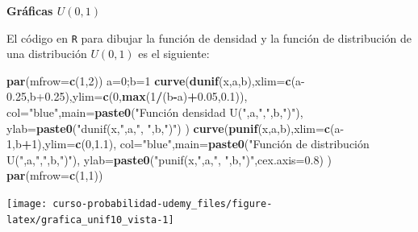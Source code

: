 \documentclass[]{book}
\newenvironment{Shaded}{\begin{snugshade}}{\end{snugshade}}
\newcommand{\DataTypeTok}[1]{\textcolor[rgb]{0.13,0.29,0.53}{#1}}
\newcommand{\DecValTok}[1]{\textcolor[rgb]{0.00,0.00,0.81}{#1}}
\newcommand{\FloatTok}[1]{\textcolor[rgb]{0.00,0.00,0.81}{#1}}
\newcommand{\KeywordTok}[1]{\textcolor[rgb]{0.13,0.29,0.53}{\textbf{#1}}}
\newcommand{\NormalTok}[1]{#1}
\newcommand{\OperatorTok}[1]{\textcolor[rgb]{0.81,0.36,0.00}{\textbf{#1}}}
\newcommand{\StringTok}[1]{\textcolor[rgb]{0.31,0.60,0.02}{#1}}
\begin{document}
\textbf{Gráficas \(U(0,1)\)}

El código en \texttt{R} para dibujar la función de densidad y la función de distribución de una distribución \(U(0,1)\) es el siguiente:

\begin{Shaded}
\begin{Highlighting}[]
\KeywordTok{par}\NormalTok{(}\DataTypeTok{mfrow=}\KeywordTok{c}\NormalTok{(}\DecValTok{1}\NormalTok{,}\DecValTok{2}\NormalTok{))}
\NormalTok{a=}\DecValTok{0}\NormalTok{;b=}\DecValTok{1}
\KeywordTok{curve}\NormalTok{(}\KeywordTok{dunif}\NormalTok{(x,a,b),}\DataTypeTok{xlim=}\KeywordTok{c}\NormalTok{(a}\FloatTok{-0.25}\NormalTok{,b}\FloatTok{+0.25}\NormalTok{),}\DataTypeTok{ylim=}\KeywordTok{c}\NormalTok{(}\DecValTok{0}\NormalTok{,}\KeywordTok{max}\NormalTok{(}\DecValTok{1}\OperatorTok{/}\NormalTok{(b}\OperatorTok{-}\NormalTok{a)}\OperatorTok{+}\FloatTok{0.05}\NormalTok{,}\FloatTok{0.1}\NormalTok{)),}
      \DataTypeTok{col=}\StringTok{"blue"}\NormalTok{,}\DataTypeTok{main=}\KeywordTok{paste0}\NormalTok{(}\StringTok{"Función densidad  U("}\NormalTok{,a,}\StringTok{","}\NormalTok{,b,}\StringTok{")"}\NormalTok{),}
      \DataTypeTok{ylab=}\KeywordTok{paste0}\NormalTok{(}\StringTok{"dunif(x,"}\NormalTok{,a,}\StringTok{", "}\NormalTok{,b,}\StringTok{")"}\NormalTok{)}
\NormalTok{      )}
\KeywordTok{curve}\NormalTok{(}\KeywordTok{punif}\NormalTok{(x,a,b),}\DataTypeTok{xlim=}\KeywordTok{c}\NormalTok{(a}\DecValTok{-1}\NormalTok{,b}\OperatorTok{+}\DecValTok{1}\NormalTok{),}\DataTypeTok{ylim=}\KeywordTok{c}\NormalTok{(}\DecValTok{0}\NormalTok{,}\FloatTok{1.1}\NormalTok{),}
      \DataTypeTok{col=}\StringTok{"blue"}\NormalTok{,}\DataTypeTok{main=}\KeywordTok{paste0}\NormalTok{(}\StringTok{"Función de distribución U("}\NormalTok{,a,}\StringTok{","}\NormalTok{,b,}\StringTok{")"}\NormalTok{),}
      \DataTypeTok{ylab=}\KeywordTok{paste0}\NormalTok{(}\StringTok{"punif(x,"}\NormalTok{,a,}\StringTok{", "}\NormalTok{,b,}\StringTok{")"}\NormalTok{,}\DataTypeTok{cex.axis=}\FloatTok{0.8}\NormalTok{)}
\NormalTok{      )}
\KeywordTok{par}\NormalTok{(}\DataTypeTok{mfrow=}\KeywordTok{c}\NormalTok{(}\DecValTok{1}\NormalTok{,}\DecValTok{1}\NormalTok{))}
\end{Highlighting}
\end{Shaded}

\begin{center}\texttt{[image: curso-probabilidad-udemy\_files/figure-latex/grafica\_unif10\_vista-1]} \end{center}
\end{document}

